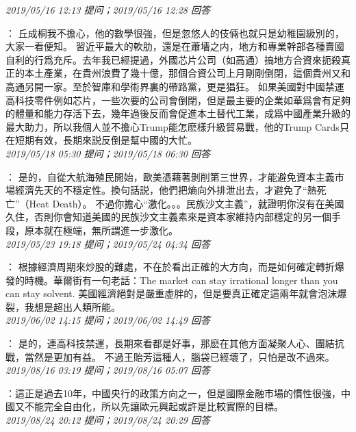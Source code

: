\documentclass[twocolumn]{ctexart}
\begin{document}
\textit{\hfill\noindent\small 2019/05/16 12:13 提问；2019/05/16 12:28 回答}

：
丘成桐我不擔心，他的數學很強，但是忽悠人的伎倆也就只是幼稚園級別的，大家一看便知。
習近平最大的軟肋，還是在蕭墻之内，地方和專業幹部各種賣國自利的行爲充斥。去年我已經提過，外國芯片公司（如高通）搞地方合資來扼殺真正的本土產業，在貴州浪費了幾十億，那個合資公司上月剛剛倒閉，這個貴州又和高通另開一家。至於智庫和學術界裏的帶路黨，更是猖狂。
如果美國對中國禁運高科技零件例如芯片，一些次要的公司會倒閉，但是最主要的企業如華爲會有足夠的體量和能力存活下去，幾年過後反而會促進本土替代工業，成爲中國產業升級的最大助力，所以我個人並不擔心Trump能怎麽樣升級貿易戰，他的Trump Cards只在短期有效，長期來説反倒是幫中國的大忙。
\\

\textit{\hfill\noindent\small 2019/05/18 05:30 提问；2019/05/18 06:30 回答}

：
是的，自從大航海殖民開始，歐美憑藉著剝削第三世界，才能避免資本主義市場經濟先天的不穩定性。換句話説，他們把熵向外排泄出去，才避免了“熱死亡”（Heat Death）。
不過你擔心“激化。。。民族沙文主義”，就證明你沒有在美國久住，否則你會知道美國的民族沙文主義素來是資本家維持内部穩定的另一個手段，原本就在極端，無所謂進一步激化。
\\

\textit{\hfill\noindent\small 2019/05/23 19:18 提问；2019/05/24 04:34 回答}

：
根據經濟周期來炒股的難處，不在於看出正確的大方向，而是如何確定轉折爆發的時機。華爾街有一句老話：The market can stay irrational longer than you can stay solvent.
美國經濟絕對是嚴重虛胖的，但是要真正確定這兩年就會泡沫爆裂，我想是超出人類所能。
\\

\textit{\hfill\noindent\small 2019/06/02 14:15 提问；2019/06/02 14:49 回答}

：
是的，連高科技禁運，長期來看都是好事，那麽在其他方面凝聚人心、團結抗戰，當然是更加有益。
不過王貽芳這種人，腦袋已經壞了，只怕是改不過來。
\\

\textit{\hfill\noindent\small 2019/08/16 03:19 提问；2019/08/16 05:07 回答}

：這正是過去10年，中國央行的政策方向之一，但是國際金融市場的慣性很強，中國又不能完全自由化，所以先讓歐元興起或許是比較實際的目標。
\\

\textit{\hfill\noindent\small 2019/08/24 20:12 提问；2019/08/24 20:29 回答}
\end{document}
